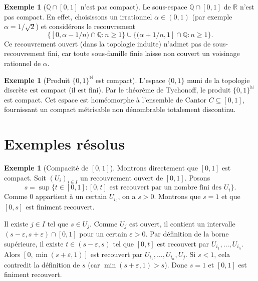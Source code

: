 \documentclass[12pt,a4paper,openany]{book}
\theoremstyle{definition}
\theoremstyle{cours}
\theoremstyle{coursnormal}
\newtheorem{exemple}[theoreme]{Exemple}
\newcommand{\N}{\mathbb{N}}
\newcommand{\Q}{\mathbb{Q}}
\newcommand{\R}{\mathbb{R}}
\begin{document}
\begin{exemple}[{$\Q\cap[0,1]$ n'est pas compact}]\label{ex:Q-pas-compact}
  Le sous-espace $\Q\cap[0,1]$ de $\R$ n'est pas compact. En effet,
  choisissons un irrationnel $\alpha\in(0,1)$ (par exemple $\alpha=1/\sqrt{2}$)
  et considérons le recouvrement
  \[
    \bigl\{[0,\alpha-1/n)\cap\Q : n\geq 1\bigr\}
    \cup \bigl\{(\alpha+1/n,1]\cap\Q : n\geq 1\bigr\}.
  \]
  Ce recouvrement ouvert (dans la topologie induite) n'admet pas de
  sous-recouvrement fini, car toute sous-famille finie laisse non couvert un
  voisinage rationnel de $\alpha$.
\end{exemple}

\begin{exemple}[Produit $\{0,1\}^{\N}$ est compact]\label{ex:cantor-compact}
  L'espace $\{0,1\}$ muni de la topologie discrète est compact (il est fini).
  Par le théorème de Tychonoff, le produit
  $\{0,1\}^{\N}$ est compact. Cet espace est homéomorphe à l'ensemble de
  Cantor $C\subseteq[0,1]$, fournissant un compact métrisable non
  dénombrable totalement discontinu.
\end{exemple}

\section{Exemples résolus}\label{sec:exemples-compacite}

\begin{exemple}[{Compacité de $[0,1]$}]\label{ex:compact-01}
  Montrons directement que $[0,1]$ est compact. Soit
  $(U_i)_{i\in I}$ un recouvrement ouvert de $[0,1]$. Posons
  \[
    s = \sup\bigl\{t\in[0,1] : [0,t] \text{ est recouvert par un nombre fini
    des } U_i\bigr\}.
  \]
  Comme $0$ appartient à un certain $U_{i_0}$, on a $s>0$. Montrons que $s=1$
  et que $[0,s]$ est finiment recouvert.

  Il existe $j\in I$ tel que $s\in U_j$. Comme $U_j$ est ouvert, il contient
  un intervalle $(s-\varepsilon,s+\varepsilon)\cap[0,1]$ pour un certain
  $\varepsilon>0$. Par définition de la borne supérieure, il existe $t\in
  (s-\varepsilon,s)$ tel que $[0,t]$ est recouvert par $U_{i_1},\ldots,U_{i_n}$.
  Alors $[0,\min(s+\varepsilon,1)]$ est recouvert par $U_{i_1},\ldots,U_{i_n},
  U_j$. Si $s<1$, cela contredit la définition de $s$ (car $\min(s+\varepsilon,
  1)>s$). Donc $s=1$ et $[0,1]$ est finiment recouvert.
\end{exemple}
\end{document}
